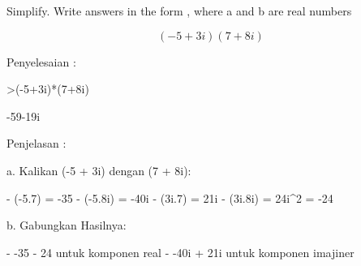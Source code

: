 \documentclass{article}
\begin{document}
\begin{eulernotebook}
\begin{eulercomment}
\begin{eulercomment}
\begin{eulercomment}
\end{eulercomment}
\begin{eulercomment}
Simplify. Write answers in the form , where a and b are real numbers\\
\end{eulercomment}
\begin{eulerformula}
\[
(-5+3i)(7+8i)
\]
\end{eulerformula}
\begin{eulercomment}
Penyelesaian :
\end{eulercomment}
\begin{eulerprompt}
>(-5+3i)*(7+8i)
\end{eulerprompt}
\begin{euleroutput}
  -59-19i
\end{euleroutput}
\begin{eulercomment}
Penjelasan :

a. Kalikan (-5 + 3i) dengan (7 + 8i):\\
\end{eulercomment}
\begin{eulerttcomment}
   - (-5.7) = -35
   - (-5.8i) = -40i
   - (3i.7) = 21i
   - (3i.8i) = 24i^2 = -24
\end{eulerttcomment}
\begin{eulercomment}

b. Gabungkan Hasilnya:\\
\end{eulercomment}
\begin{eulerttcomment}
   - -35 - 24 untuk komponen real
   - -40i + 21i untuk komponen imajiner
\end{eulerttcomment}
\begin{eulercomment}


\end{eulercomment}
\end{eulercomment}
\end{eulercomment}
\end{eulernotebook}
\end{document}
